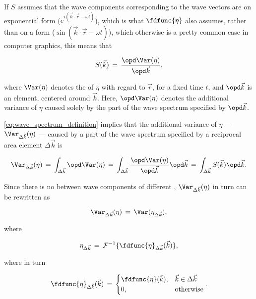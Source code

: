 {If $S$ assumes that the wave components corresponding to the wave vectors are on exponential form ($e^{i(\vec{k}\cdot\vec{r}-\omega t)}$), which is what $\fdfunc{\eta}$ also assumes, rather than on a \sinusoidal form ($\sin(\vec{k}\cdot\vec{r}-\omega t)$), which otherwise is a pretty common case in computer graphics, this means that

\begin{equation} \label{eq:wave_spectrum_definition}
S(\vec{k}) \,=\, \frac{\opd \Var(\eta)}{\opd\vec{k}},
\end{equation}

where $\Var(\eta)$ denotes the \variance of $\eta$ with regard to $\vec{r}$, for a fixed time $t$, and $\opd\vec{k}$ is an \infinitesimal {} element, centered around $\vec{k}$. Here, $\opd\Var(\eta)$ denotes the additional variance of $\eta$ caused solely by the part of the wave spectrum specified by $\opd\vec{k}$.

\eqref{eq:wave_spectrum_definition} implies that the additional variance of $\eta$ --- $\Var_{\Delta\vec{k}}(\eta)$ --- caused by a part of the wave spectrum specified by a reciprocal area element $\Delta\vec{k}$ is

\begin{equation} \label{eq:variance_k_eta}
\Var_{\Delta\vec{k}}(\eta) \,=\, \int_{\Delta\vec{k}}\opd \Var(\eta) \,=\, \int_{\Delta\vec{k}}\frac{\opd \Var(\eta)}{\opd\vec{k}}\opd\vec{k} \,=\, \int_{\Delta\vec{k}}S(\vec{k})\opd\vec{k}.
\end{equation}

Since there is no \correlation between wave components of different \wavelengths, $\Var_{\Delta\vec{k}}(\eta)$ in turn can be rewritten as

\begin{equation} \label{eq:variance_k_eta_to_variance_eta_k}
\Var_{\Delta\vec{k}}(\eta) \,=\, \Var(\eta_{\Delta\vec{k}}),
\end{equation}

where

\begin{equation} \label{eq:eta_k_of_fd_eta_k}
\eta_{\Delta\vec{k}} \,=\, \mathcal{F}^{-1}\{\fdfunc{\eta}_{\Delta\vec{k}}(\vec{k})\},
\end{equation}

where in turn

\begin{equation}
\fdfunc{\eta}_{\Delta\vec{k}}(\vec{k}) \,=\, \begin{cases}
\fdfunc{\eta}(\vec{k}), & \vec{k} \in \Delta\vec{k} \\
0, & \text{otherwise}
\end{cases}.
\end{equation}

}
